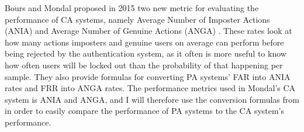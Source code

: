 \documentclass[informationsecurity]{gucmasterproject}
\begin{document}
Bours and Mondal proposed in 2015 two new metric for evaluating the performance of CA systems, namely Average Number of Imposter Actions (ANIA) and Average Number of Genuine Actions (ANGA) \cite{CA-performance}.
These rates look at how many actions imposters and genuine users on average can perform before being rejected by the authentication system, as it often is more useful to know how often users will be locked out than the probability of that happening per sample.
They also provide formulas for converting PA systems' FAR into ANIA rates and FRR into ANGA rates.
The performance metrics used in Mondal's \cite{mondal} CA system is ANIA and ANGA, and I will therefore use the conversion formulas from \cite{CA-performance} in order to easily compare the performance of PA systems to the CA system's performance.




%

\end{document}
